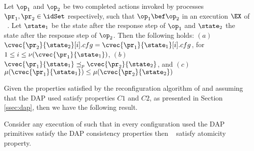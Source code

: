 {\begin{theorem}
	Let $\op_1$ and $\op_2$ be two 
	completed  actions invoked by processes $\pr_1, \pr_2\in\idSet$ 
	respectively, such that $\op_1\bef\op_2$ in an execution $\EX$ of ~\ares. 
	Let $\state_1$ be the state after the response 
	step of $\op_1$ and $\state_2$ the state after the response step 
	of $\op_2$.
	Then the following holds: 
	$(a)$	$\cvec{\pr_2}{\state_2}[i].cfg = \cvec{\pr_1}{\state_1}[i].cfg$,  for $ 1 \leq i \leq \nu(\cvec{\pr_1}{\state_1})$,
	$(b)$	$\cvec{\pr_1}{\state_1}  \preceq_p \cvec{\pr_2}{\state_2}$, and
	$(c)$	$\mu(\cvec{\pr_1}{\state_1}) \leq \mu(\cvec{\pr_2}{\state_2})$
\end{theorem}
}

%

%

Given the properties satisfied by the reconfiguration algorithm of \ares{} 
and assuming that the DAP used satisfy properties $C1$ and $C2$, as presented
in Section \ref{ssec:dap}, then  we have the following result. 

\begin{theorem}[Atomicity]
    Consider  any execution of \ares{} such that in every configuration used   the DAP primitives  satisfy  the DAP consistency properties then ~\ares{} satisfy atomicity property.
\end{theorem}


